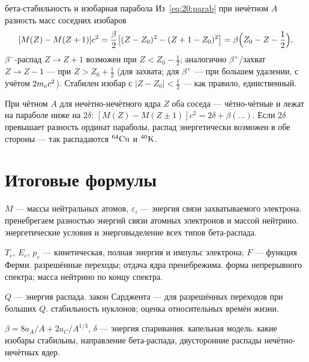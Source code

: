 \begin{derivation}[label=der:20:parab]{бета-стабильность и изобарная парабола}
Из~\eqref{eq:20:parab} при нечётном $A$ разность масс соседних изобаров
\[
  [M(Z)-M(Z+1)]c^2=\frac\beta2\bigl[(Z-Z_0)^2-(Z+1-Z_0)^2\bigr]=\beta\Bigl(Z_0-Z-\frac12\Bigr).
\]
$\beta^-$-распад $Z\to Z+1$ возможен при $Z<Z_0-\frac12$; аналогично $\beta^+$/захват $Z\to Z-1$ — при $Z>Z_0+\frac12$ (для захвата;
для $\beta^+$ — при большем удалении, с учётом $2\mel c^2$). Стабилен изобар с $|Z-Z_0|<\frac12$ — как правило, единственный.

При чётном $A$ для нечётно-нечётного ядра $Z$ оба соседа — чётно-чётные и лежат на параболе ниже на $2\delta$:
$[M(Z)-M(Z\pm1)]c^2=2\delta+\beta(\dots)$. Если $2\delta$ превышает разность ординат параболы, распад энергетически возможен в обе
стороны — так распадаются $\nucl{Cu}{64}$ и $\nucl{K}{40}$.
\end{derivation}

\section{Итоговые формулы}

 {$M$ — массы нейтральных атомов, $\varepsilon_i$ — энергия связи захватываемого электрона.}
 {пренебрегаем разностью энергий связи атомных электронов и массой нейтрино.}
 {энергетические условия и энерговыделение всех типов бета-распада.}

 {$T_e$, $E_e$, $p_e$ — кинетическая, полная энергия и импульс электрона; $F$ — функция Ферми.}
 {разрешённые переходы; отдача ядра пренебрежима.}
 {форма непрерывного спектра; масса нейтрино по концу спектра.}

 {$Q$ — энергия распада.}
 {закон Сарджента — для разрешённых переходов при больших $Q$.}
 {стабильность нуклонов; оценка относительных времён жизни.}

 {$\beta=8a_A/A+2a_C/A^{1/3}$, $\delta$ — энергия спаривания.}
 {капельная модель.}
 {какие изобары стабильны, направление бета-распада, двусторонние распады нечётно-нечётных ядер.}

